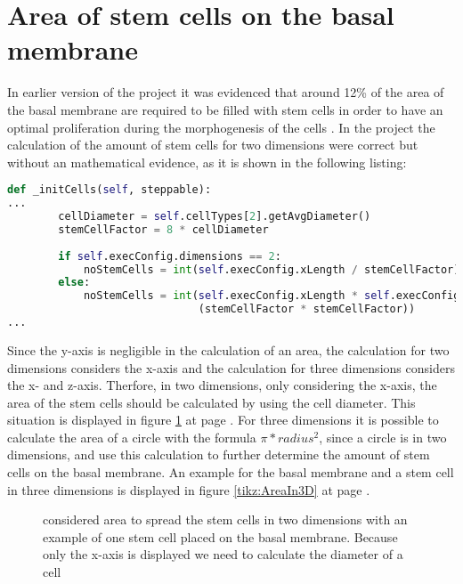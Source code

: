 \section{Area of stem cells on the basal membrane}
In earlier version of the project it was evidenced that around 12\% of the area of the basal membrane are required to be filled with stem cells in order to have an optimal proliferation during the morphogenesis of the cells \cite{Torelli2017}.
In the project the calculation of the amount of stem cells for two dimensions were correct but without an mathematical evidence, as it is shown in the following listing:
\begin{lstlisting}[language=Python, caption=calculation of the amount of stem cells on the basal membrane without a mathematical evidence]
    def _initCells(self, steppable):
...
        cellDiameter = self.cellTypes[2].getAvgDiameter()
        stemCellFactor = 8 * cellDiameter
       
        if self.execConfig.dimensions == 2:
            noStemCells = int(self.execConfig.xLength / stemCellFactor)
        else:
            noStemCells = int(self.execConfig.xLength * self.execConfig.yLength /
                              (stemCellFactor * stemCellFactor))
...
\end{lstlisting}
Since the y-axis is negligible in the calculation of an area, the calculation for two dimensions considers the x-axis and the calculation for three dimensions considers the x- and z-axis. Therfore, in two dimensions, only considering the x-axis, the area of the stem cells should be calculated by using the cell diameter. This situation is displayed in figure \ref{tikz:AreaIn2D} at page \pageref{tikz:AreaIn2D}. For three dimensions it is possible to calculate the area of a circle with the formula $\pi * radius^{2}$, since a circle is in two dimensions, and use this calculation to further determine the amount of stem cells on the basal membrane. An example for the basal membrane and a stem cell in three dimensions is displayed in figure \ref{tikz:AreaIn3D} at page \pageref{tikz:AreaIn3D}. 

\begin{figure}[h]
\begin{center}
\caption{considered area to spread the stem cells in two dimensions with an example of one stem cell placed on the basal membrane. Because only the x-axis is displayed we need to calculate the diameter of a cell}
\label{tikz:AreaIn2D}
\end{center}
\end{figure}


